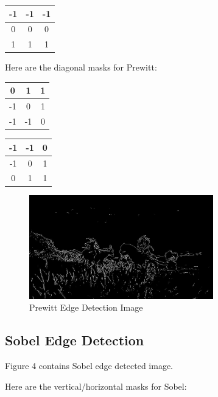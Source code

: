 \documentclass[conference]{IEEEtran}
\begin{document}
\begin{center}
\begin{tabular}{ |c|c|c| } 
\hline
-1 & -1 & -1 \\ \hline
0 & 0 & 0 \\ \hline
1 & 1 & 1 \\ \hline
\end{tabular}
\end{center}

Here are the diagonal masks for Prewitt:

\begin{center}
\begin{tabular}{ |c|c|c| } 
\hline
0 & 1 & 1 \\ \hline
-1 & 0 & 1 \\ \hline
-1 & -1 & 0 \\ \hline
\end{tabular}
\end{center}

\begin{center}
\begin{tabular}{ |c|c|c| } 
\hline
-1 & -1 & 0 \\ \hline
-1 & 0 & 1 \\ \hline
0 & 1 & 1 \\ \hline
\end{tabular}
\end{center}

\begin{figure}[htbp]
    \centering
    \includegraphics[width=8cm, height=4.5cm]{images/eldenring_prewitt.jpg}
    \caption{Prewitt Edge Detection Image}
\end{figure}

\subsection{Sobel Edge Detection}

Figure 4 contains Sobel edge detected image.

Here are the vertical/horizontal masks for Sobel:
\end{document}
